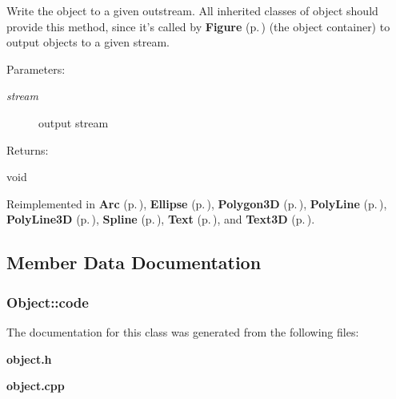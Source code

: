 Write the object to a given outstream. All inherited classes of object should provide this method, since it's called by {\bf Figure} {\rm (p.\,\pageref{classFigure})} (the object container) to output objects to a given stream. \begin{Desc}
\item[Parameters: ]\par
\begin{description}
\item[{\em 
stream}]output stream \end{description}
\end{Desc}
\begin{Desc}
\item[Returns: ]\par
void \end{Desc}


Reimplemented in {\bf Arc} {\rm (p.\,\pageref{classArc_a6})}, {\bf Ellipse} {\rm (p.\,\pageref{classEllipse_a13})}, {\bf Polygon3D} {\rm (p.\,\pageref{classPolygon3D_a8})}, {\bf Poly\-Line} {\rm (p.\,\pageref{classPolyLine_a4})}, {\bf Poly\-Line3D} {\rm (p.\,\pageref{classPolyLine3D_a8})}, {\bf Spline} {\rm (p.\,\pageref{classSpline_a5})}, {\bf Text} {\rm (p.\,\pageref{classText_a5})}, and {\bf Text3D} {\rm (p.\,\pageref{classText3D_a9})}.

\subsection{Member Data Documentation}
\subsubsection{ Object::code\hspace{0.3cm}{\tt  [protected]}}\label{classObject_n0}




The documentation for this class was generated from the following files:\begin{CompactItemize}
\item 
{\bf object.h}\item 
{\bf object.cpp}\end{CompactItemize}
